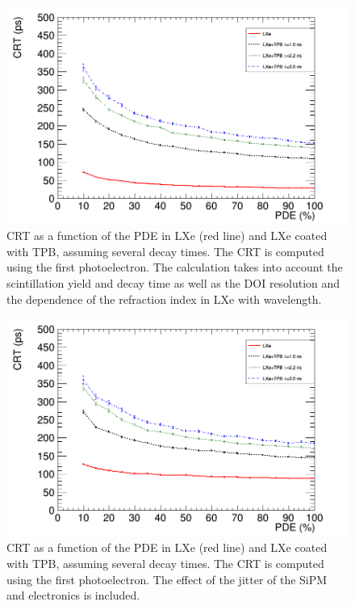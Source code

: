 \documentclass[review]{elsarticle}
\begin{document}
\begin{figure}[!bhtp]
	\centering
	\includegraphics[scale=0.4]{../img/PetaloTOF/tpb_decays_pde_500ps.png}
	\caption{\label{fig.crtTPB} CRT as a function of the PDE in LXe (red line) and LXe coated  with TPB, assuming several decay times. The CRT is computed using the first photoelectron. The calculation takes into account the scintillation yield and decay time as well as the DOI resolution and the dependence of the refraction index in LXe with wavelength. }
\end{figure}

\begin{figure}[!bhtp]
	\centering
	\includegraphics[scale=0.4]{../img/PetaloTOF/tpb_decays_jitter_500ps.png}
	\caption{\label{fig.crtTPBjit} CRT as a function of the PDE in LXe (red line) and LXe coated  with TPB, assuming several decay times. The CRT is computed using the first photoelectron. The effect of the jitter of the SiPM and electronics is included. }
\end{figure}
\end{document}
